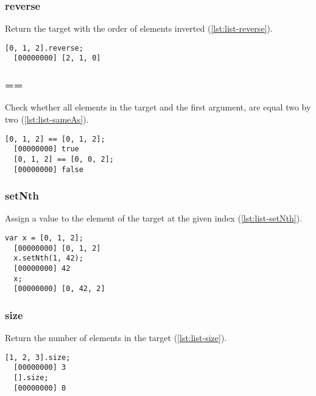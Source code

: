 \subsubsection{reverse}

Return the target with the order of elements inverted
(\autoref{lst:list-reverse}).

\begin{lstlisting}[caption=List.reverse, label=lst:list-reverse, float=\floatposh]
  [0, 1, 2].reverse;
  [00000000] [2, 1, 0]
\end{lstlisting}

\subsubsection{==}

Check whether all elements in the target and the first argument, are
equal two by two (\autoref{lst:list-sameAs}).

\begin{lstlisting}[caption={List.==}, label=lst:list-sameAs, float=\floatposh]
  [0, 1, 2] == [0, 1, 2];
  [00000000] true
  [0, 1, 2] == [0, 0, 2];
  [00000000] false
\end{lstlisting}

\subsubsection{setNth}
\label{sec:std-list-setnth}

Assign a value to the element of the target at the given index
(\autoref{lst:list-setNth}).

\begin{lstlisting}[caption=List.setNth, label=lst:list-setNth, float=\floatposh]
  var x = [0, 1, 2];
  [00000000] [0, 1, 2]
  x.setNth(1, 42);
  [00000000] 42
  x;
  [00000000] [0, 42, 2]
\end{lstlisting}

\subsubsection{size}

Return the number of elements in the target (\autoref{lst:list-size}).

\begin{lstlisting}[caption=List.size, label=lst:list-size, float=\floatposh]
  [1, 2, 3].size;
  [00000000] 3
  [].size;
  [00000000] 0
\end{lstlisting}

